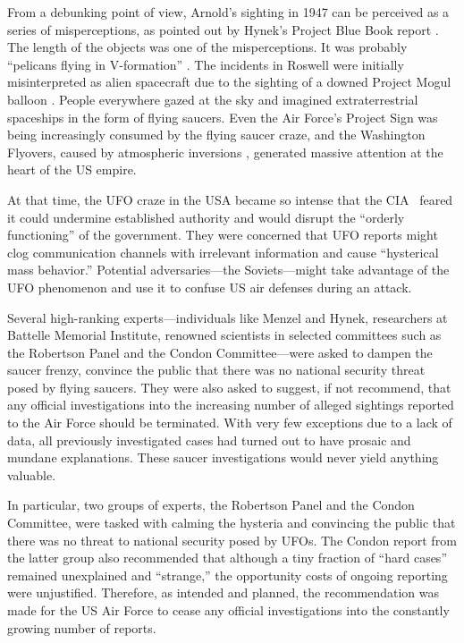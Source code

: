 From a debunking point of view, Arnold's sighting in 1947 can be perceived as a series of misperceptions, as pointed out by Hynek's Project Blue Book report \cite{1947-KA-PBB}. The length of the objects was one of the misperceptions. It was probably ``pelicans flying in V-formation'' \cite{Maccabee2017Jun}. The incidents in Roswell were initially misinterpreted as alien spacecraft due to the sighting of a downed Project Mogul balloon \cite{Weaver1995Jan}. People everywhere gazed at the sky and imagined extraterrestrial spaceships in the form of flying saucers. Even the Air Force's Project Sign was being increasingly consumed by the flying saucer craze, and the Washington Flyovers, caused by atmospheric inversions \cite{Menzel_1953}, generated massive attention at the heart of the US empire.

At that time, the UFO craze in the USA became so intense that the CIA~\cite{Haines-CIA-UFO} feared it could undermine established authority
and would disrupt the ``orderly functioning'' of the government.
They were concerned that UFO reports might clog communication channels with irrelevant information and cause ``hysterical mass behavior.'' Potential adversaries---the Soviets---might take advantage of the UFO phenomenon
and use it to confuse US air defenses during an attack.

Several high-ranking experts---individuals like Menzel and Hynek, researchers at Battelle Memorial Institute,
renowned scientists in selected committees such as the Robertson Panel and the Condon Committee---were asked to dampen the saucer frenzy,
convince the public that there was no national security threat posed by flying saucers.
They were also asked to suggest, if not recommend, that any official investigations into the increasing number of
alleged sightings reported to the Air Force should be terminated.
With very few exceptions due to a lack of data, all previously investigated cases had turned out to have prosaic and mundane explanations.
These saucer investigations would never yield anything valuable.

In particular, two groups of experts, the Robertson Panel and the Condon Committee,
were tasked with calming the hysteria and convincing the public that there was no threat to national security posed by UFOs.
The Condon report from the latter group also recommended that although a tiny fraction of ``hard cases'' remained unexplained and ``strange,'' the opportunity costs of ongoing reporting were unjustified. Therefore, as intended and planned, the recommendation was made for the US Air Force to cease any official investigations into the constantly growing number of reports.

